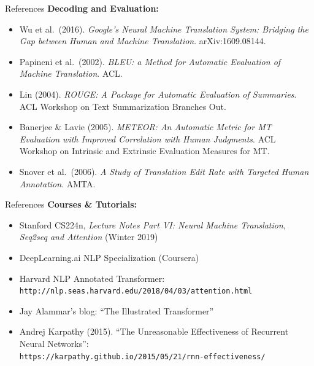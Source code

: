 \begin{frame}{References}
  \textbf{Decoding and Evaluation:}
  \begin{itemize}
    \item[$\blacktriangleright$] Wu et al.\ (2016). \textit{Google's Neural Machine Translation System: Bridging the Gap between Human and Machine Translation}. arXiv:1609.08144.
    \item[$\blacktriangleright$] Papineni et al.\ (2002). \textit{BLEU: a Method for Automatic Evaluation of Machine Translation}. ACL.
    \item[$\blacktriangleright$] Lin (2004). \textit{ROUGE: A Package for Automatic Evaluation of Summaries}. ACL Workshop on Text Summarization Branches Out.
    \item[$\blacktriangleright$] Banerjee \& Lavie (2005). \textit{METEOR: An Automatic Metric for MT Evaluation with Improved Correlation with Human Judgments}. ACL Workshop on Intrinsic and Extrinsic Evaluation Measures for MT.
    \item[$\blacktriangleright$] Snover et al.\ (2006). \textit{A Study of Translation Edit Rate with Targeted Human Annotation}. AMTA.
  \end{itemize}
\end{frame}

\begin{frame}{References}
  \textbf{Courses \& Tutorials:}
  \begin{itemize}
    \item[$\blacktriangleright$] Stanford CS224n, \textit{Lecture Notes Part VI: Neural Machine Translation, Seq2seq and Attention} (Winter 2019)
    \item[$\blacktriangleright$] DeepLearning.ai NLP Specialization (Coursera)
    \item[$\blacktriangleright$] Harvard NLP Annotated Transformer:\\
      \texttt{\color{magenta}http://nlp.seas.harvard.edu/2018/04/03/attention.html}
    \item[$\blacktriangleright$] Jay Alammar's blog: ``The Illustrated Transformer''
    \item[$\blacktriangleright$] Andrej Karpathy (2015). ``The Unreasonable Effectiveness of Recurrent Neural Networks'':\\
      \texttt{\color{magenta}https://karpathy.github.io/2015/05/21/rnn-effectiveness/}
  \end{itemize}
\end{frame}
